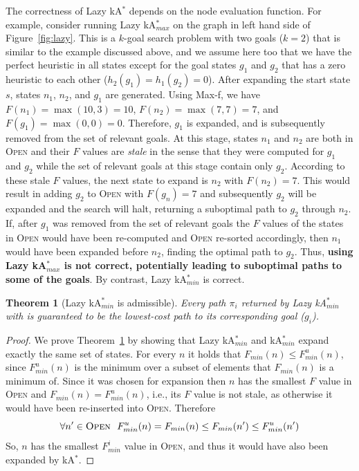 \documentclass{aicom2e}
\newtheorem{theorem}{Theorem}
\newcommand{\kgs}{$k$-goal search}
\newcommand{\kastar}{kA$^*$}
\newcommand{\kastarmin}{kA$^*_{min}$}
\newcommand{\kastarmax}{kA$^*_{max}$}
\newcommand{\maxf}{Max-f}
\newcommand{\open}{\textsc{Open}}
\begin{document}
The correctness of Lazy \kastar{} depends on the node evaluation function. For example, consider running Lazy \kastarmax{} on the graph in left hand side of Figure~\ref{fig:lazy}. This is a \kgs{} problem with two goals ($k=2$) that is similar to the example discussed above, and we assume here too that we have the perfect heuristic in all states except for the goal states $g_1$ and $g_2$ that has a zero heuristic to each other ($h_2(g_1)=h_1(g_2)=0$). After expanding the start state $s$, states $n_1$, $n_2$, and $g_1$ are generated. Using \maxf{}, we have $F(n_1)=\max(10,3)=10$, $F(n_2)=\max(7,7)=7$, and $F(g_1)=\max(0,0)=0$. Therefore, $g_1$ is expanded, and is subsequently removed from the set of relevant goals. At this stage, states $n_1$ and $n_2$ are both in \open{} and their $F$ values are {\em stale} in the sense that they were computed for $g_1$ and $g_2$ while the set of relevant goals at this stage contain only $g_2$. According to these stale $F$ values, the next state to expand is $n_2$ with $F(n_2)=7$. This would result in adding $g_2$ to \open{} with $F(g_n)=7$ and subsequently $g_2$ will be expanded and the search will halt, returning a suboptimal path to $g_2$ through $n_2$. If, after $g_1$ was removed from the set of relevant goals the $F$ values of the states in \open{} would have been re-computed and \open{} re-sorted accordingly, then $n_1$ would have been expanded before $n_2$, finding the optimal path to $g_2$. Thus, {\bf using Lazy \kastarmax{} is not correct, potentially leading to suboptimal paths to some of the goals}. By contrast, Lazy \kastarmin{} is correct. 


\begin{theorem}[Lazy \kastarmin{} is admissible]
Every path $\pi_i$ returned by Lazy \kastarmin{} with is guaranteed to be the lowest-cost path to its corresponding goal ($g_i$).
\label{the:lazy-minf-correct}
\end{theorem}
\begin{proof}
	We prove Theorem~\ref{the:lazy-minf-correct} by showing that Lazy \kastarmin{} and \kastarmin{}  expand exactly the same set of states. For every $n$ it holds that $F_{min}(n)\leq F^u_{min}(n)$, since $F^u_{min}(n)$ is the minimum over a subset of elements that $F_{min}(n)$ is a minimum of. 
	Since it was chosen for expansion then $n$ has the smallest $F$ value in \open{}
	and $F_{min}(n)=F^u_{min}(n)$, i.e., its $F$ value is not stale, as otherwise it would have been re-inserted into \open{}. Therefore 
	\[ \forall n'\in\open{} ~~ F^u_{min}(n)=F_{min}(n)\leq F_{min}(n') \leq F^u_{min}(n') \]
	So, $n$ has the smallest $F^i_{min}$ value in \open{}, and thus it would have also been expanded by \kastar{}. 
\end{proof}
\end{document}
